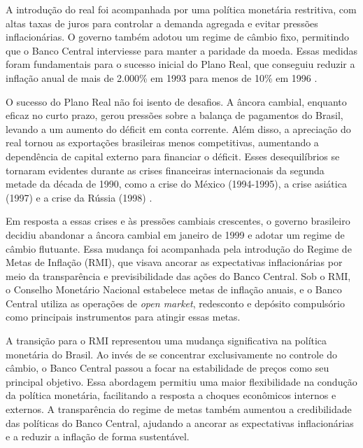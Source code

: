 \documentclass[12pt,oneside,a4paper,chapter=TITLE,english,brazil,sumario=abnt-6027-2012]{abntex2}
\begin{document}
A introdução do real foi acompanhada por uma política monetária restritiva, com altas taxas de juros para controlar a demanda agregada e evitar pressões inflacionárias. O governo também adotou um regime de câmbio fixo, permitindo que o Banco Central interviesse para manter a paridade da moeda. Essas medidas foram fundamentais para o sucesso inicial do Plano Real, que conseguiu reduzir a inflação anual de mais de 2.000\% em 1993 para menos de 10\% em 1996 \cite{fabiogiambiagi_1999_a}.

O sucesso do Plano Real não foi isento de desafios. A âncora cambial, enquanto eficaz no curto prazo, gerou pressões sobre a balança de pagamentos do Brasil, levando a um aumento do déficit em conta corrente. Além disso, a apreciação do real tornou as exportações brasileiras menos competitivas, aumentando a dependência de capital externo para financiar o déficit. Esses desequilíbrios se tornaram evidentes durante as crises financeiras internacionais da segunda metade da década de 1990, como a crise do México (1994-1995), a crise asiática (1997) e a crise da Rússia (1998) \cite{santna_2002_crises}.

Em resposta a essas crises e às pressões cambiais crescentes, o governo brasileiro decidiu abandonar a âncora cambial em janeiro de 1999 e adotar um regime de câmbio flutuante. Essa mudança foi acompanhada pela introdução do Regime de Metas de Inflação (RMI), que visava ancorar as expectativas inflacionárias por meio da transparência e previsibilidade das ações do Banco Central. Sob o RMI, o Conselho Monetário Nacional estabelece metas de inflação anuais, e o Banco Central utiliza as operações de \textit{open market}, redesconto e depósito compulsório como  principais instrumentos para atingir essas metas.


A transição para o RMI representou uma mudança significativa na política monetária do Brasil. Ao invés de se concentrar exclusivamente no controle do câmbio, o Banco Central passou a focar na estabilidade de preços como seu principal objetivo. Essa abordagem permitiu uma maior flexibilidade na condução da política monetária, facilitando a resposta a choques econômicos internos e externos. A transparência do regime de metas também aumentou a credibilidade das políticas do Banco Central, ajudando a ancorar as expectativas inflacionárias e a reduzir a inflação de forma sustentável.
\end{document}
